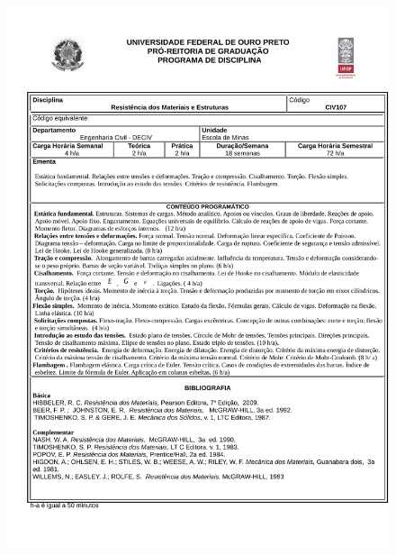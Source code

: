 \begin{figure}[p]
	\centering 
	\includegraphics[scale=0.7]{capitulos/anexo1-programas-disciplina/p84.pdf}
\end{figure}

